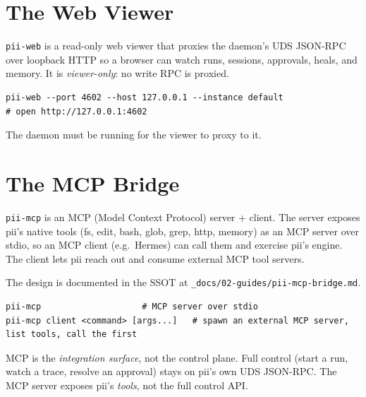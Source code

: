 \documentclass[
	fontsize=10pt,
	twoside=false,
	secnumdepth=2,
	open=any,
]{kaobook}
\begin{document}
\chapter{The Web Viewer}
\label{chap:web}

\texttt{pii-web} is a read-only web viewer that proxies the daemon's UDS
JSON-RPC over loopback HTTP so a browser can watch runs, sessions,
approvals, heals, and memory. It is \emph{viewer-only}: no write RPC is
proxied.

\begin{cmdbox}
\begin{lstlisting}
pii-web --port 4602 --host 127.0.0.1 --instance default
# open http://127.0.0.1:4602
\end{lstlisting}
\end{cmdbox}

The daemon must be running for the viewer to proxy to it.

\chapter{The MCP Bridge}
\label{chap:mcp}

\texttt{pii-mcp} is an MCP (Model Context Protocol) server + client. The
server exposes pii's native tools (fs, edit, bash, glob, grep, http,
memory) as an MCP server over stdio, so an MCP client (e.g.\ Hermes) can
call them and exercise pii's engine. The client lets pii reach out and
consume external MCP tool servers.

The design is documented in the SSOT at
\texttt{\_docs/02-guides/pii-mcp-bridge.md}.

\begin{cmdbox}[MCP]
\begin{lstlisting}
pii-mcp                    # MCP server over stdio
pii-mcp client <command> [args...]   # spawn an external MCP server, list tools, call the first
\end{lstlisting}
\end{cmdbox}

\begin{warnbox}[Important]
MCP is the \emph{integration surface}, not the control plane. Full control
(start a run, watch a trace, resolve an approval) stays on pii's own UDS
JSON-RPC. The MCP server exposes pii's \emph{tools}, not the full control
API.
\end{warnbox}
\end{document}
